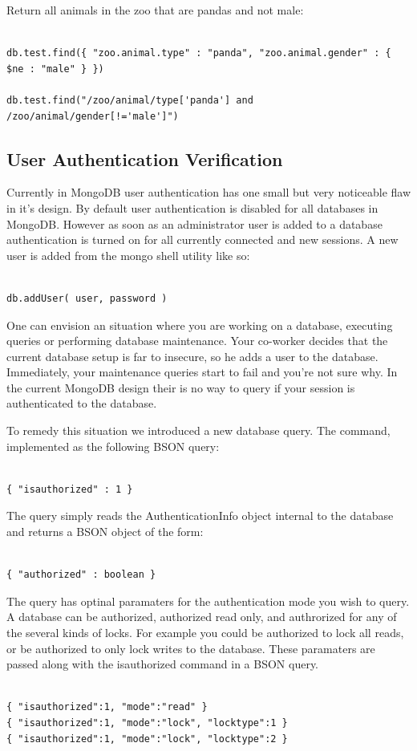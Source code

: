 \documentclass{../dependencies/acm_proc_article-sp}
\begin{document}
Return all animals in the zoo that are pandas and not male:
\begin{lstlisting}

db.test.find({ "zoo.animal.type" : "panda", "zoo.animal.gender" : { $ne : "male" } })

db.test.find("/zoo/animal/type['panda'] and /zoo/animal/gender[!='male']")
\end{lstlisting}

\subsection{User Authentication Verification}
Currently in MongoDB user authentication has one small but very noticeable flaw in it's design.
By default user authentication is disabled for all databases in MongoDB. However as soon as an administrator
user is added to a database authentication is turned on for all currently connected and new sessions.
A new user is added from the mongo shell utility like so:
\begin{lstlisting}

db.addUser( user, password )
\end{lstlisting}

One can envision an situation where you are working on a database, executing queries
or performing database maintenance. Your co-worker decides that the current database setup
is far to insecure, so he adds a user to the database. Immediately, your maintenance queries
start to fail and you're not sure why. In the current MongoDB design their is no way
to query if your session is authenticated to the database.

To remedy this situation we introduced a new database query.
The command, implemented as the following BSON query:
\begin{lstlisting}

{ "isauthorized" : 1 }
\end{lstlisting}

The query simply reads the AuthenticationInfo object internal to the database
and returns a BSON object of the form:
\begin{lstlisting}

{ "authorized" : boolean }
\end{lstlisting}

The query has optinal paramaters for the authentication mode you wish to query.
A database can be authorized, authorized read only, and authrorized for any
of the several kinds of locks. For example you could be authorized to lock all
reads, or be authorized to only lock writes to the database.
These paramaters are passed along with the isauthorized command in a BSON query.
\begin{lstlisting}

{ "isauthorized":1, "mode":"read" }
{ "isauthorized":1, "mode":"lock", "locktype":1 }
{ "isauthorized":1, "mode":"lock", "locktype":2 }
\end{lstlisting}
\end{document}

